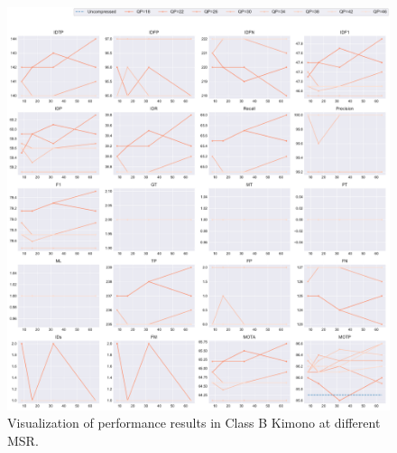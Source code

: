\begin{figure}[!htbp]
\centering
\includegraphics[width=1.0\linewidth]{img/appendix/Kimono_all_multiplots_msr.pdf}
\caption[Visualization of performance results in Class B Kimono at different MSR]
{Visualization of performance results in Class B Kimono at different MSR.}
\label{fig:Kimono_all_msr}
\end{figure}



